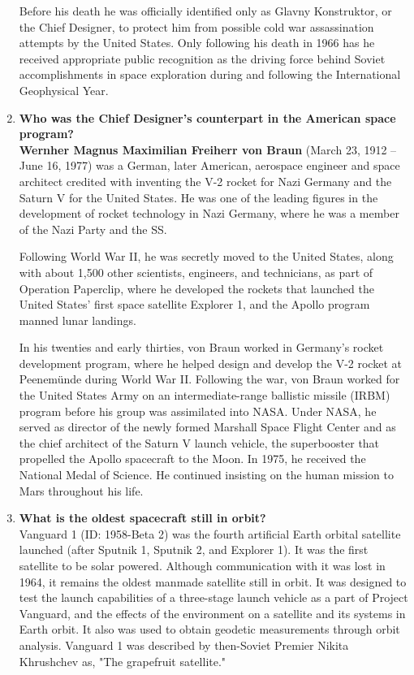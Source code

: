 \documentclass{article}
\begin{document}
\begin{enumerate}
Before his death he was officially identified only as Glavny Konstruktor, or the Chief Designer, to protect him from possible cold war assassination attempts by the United States. Only following his death in 1966 has he received appropriate public recognition as the driving force behind Soviet accomplishments in space exploration during and following the International Geophysical Year. \cite{korolev}
	
	\item {\bf Who was the Chief Designer’s counterpart in the American space program?}\\
	
{\bf Wernher Magnus Maximilian Freiherr von Braun} (March 23, 1912 – June 16, 1977) was a German, later American, aerospace engineer and space architect credited with inventing the V-2 rocket for Nazi Germany and the Saturn V for the United States. He was one of the leading figures in the development of rocket technology in Nazi Germany, where he was a member of the Nazi Party and the SS.

Following World War II, he was secretly moved to the United States, along with about 1,500 other scientists, engineers, and technicians, as part of Operation Paperclip, where he developed the rockets that launched the United States' first space satellite Explorer 1, and the Apollo program manned lunar landings.

In his twenties and early thirties, von Braun worked in Germany's rocket development program, where he helped design and develop the V-2 rocket at Peenemünde during World War II. Following the war, von Braun worked for the United States Army on an intermediate-range ballistic missile (IRBM) program before his group was assimilated into NASA. Under NASA, he served as director of the newly formed Marshall Space Flight Center and as the chief architect of the Saturn V launch vehicle, the superbooster that propelled the Apollo spacecraft to the Moon. In 1975, he received the National Medal of Science. He continued insisting on the human mission to Mars throughout his life. \cite{vonbraun}
	
	\item {\bf What is the oldest spacecraft still in orbit?}\\
	
Vanguard 1 (ID: 1958-Beta 2) was the fourth artificial Earth orbital satellite launched (after Sputnik 1, Sputnik 2, and Explorer 1). It was the first satellite to be solar powered. Although communication with it was lost in 1964, it remains the oldest manmade satellite still in orbit. It was designed to test the launch capabilities of a three-stage launch vehicle as a part of Project Vanguard, and the effects of the environment on a satellite and its systems in Earth orbit. It also was used to obtain geodetic measurements through orbit analysis. Vanguard 1 was described by then-Soviet Premier Nikita Khrushchev as, "The grapefruit satellite." \cite{vanguard1}
	

\end{enumerate}
\end{document}
